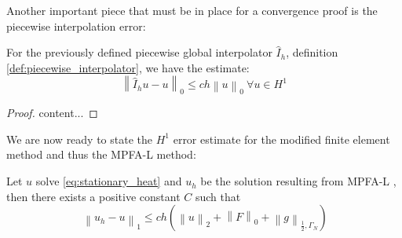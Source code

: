 \documentclass[../Main/main.tex]{subfiles}
\begin{document}
	Another important piece that must be in place for a convergence proof is the piecewise interpolation error:
	\begin{lemma}\label{lemma:int_error}
		For the previously defined piecewise global interpolator $\hat{I}_h$, definition \ref{def:piecewise_interpolator}, we have the estimate:
		\begin{equation}
			\left \| \hat{I}_h u - u \right \|_0 \leq c h \left \| u \right \|_0 \ \forall u \in H^1
		\end{equation}
	\end{lemma}
	\begin{proof}
		content...
	\end{proof}

	We are now ready to state the $H^1$ error estimate for the modified finite element method and thus the MPFA-L method:
	\begin{theorem}
		Let $u$ solve \eqref{eq:stationary_heat} and $u_h$ be the solution resulting from MPFA-L , then there exists a positive constant $C$ such that
		\begin{equation}\
			\left \|u_h - u \right \|_1 \leq c h (\left \| u \right \|_2 + \left \| F \right \|_0 + \left \| g \right \|_{\frac{1}{2},\Gamma_N})
		\end{equation}
	\end{theorem}
\end{document}

